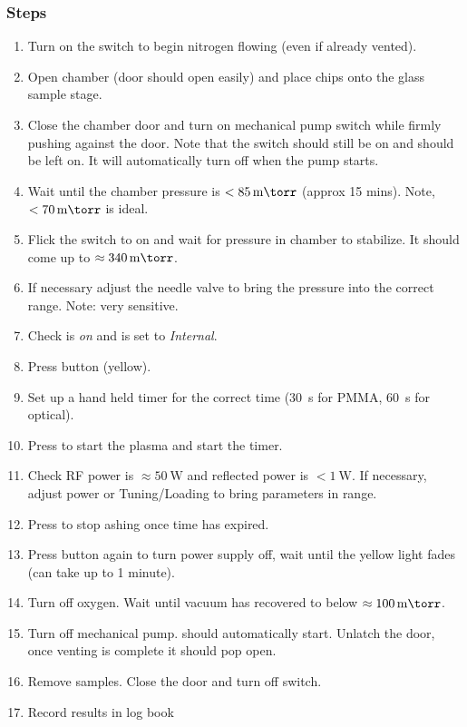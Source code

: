 \documentclass[12pt,a4paper]{report}
\begin{document}
\subsubsection{Steps}
\begin{enumerate}
  \item Turn on the  switch to begin nitrogen flowing (even if already vented).
  \item Open chamber (door should open easily) and place chips onto the glass sample stage.
  \item Close the chamber door and turn on mechanical pump switch while firmly pushing against the door. Note that
  the  switch should still be on and should be left on. It will automatically turn off when the pump starts.
  \item Wait until the chamber pressure is $< \SI{85}{\milli\torr}$ (approx 15 mins). Note, $< \SI{70}{\milli\torr}$ is ideal.
  \item Flick the  switch to on and wait for pressure in chamber to stabilize. It should come up to $\approx\SI{340}{\milli\torr}$.
  \item If necessary adjust the needle valve to bring the  pressure into the correct range. Note: very sensitive.
  \item Check  is {\em on} and  is set to {\em Internal}.
  \item Press  button (yellow).
  \item Set up a hand held timer for the correct time (\SI{30}{\second} for PMMA, \SI{60}{\second} for optical).
  \item Press  to start the plasma and start the timer.
  \item Check RF power is $\approx\SI{50}{\watt}$ and reflected power is $< \SI{1}{\watt}$. If necessary, adjust power or Tuning/Loading
    to bring parameters in range.
  \item Press  to stop ashing once time has expired.
  \item Press  button again to turn power supply off, wait until the yellow light fades (can take up to 1 minute).
  \item Turn off oxygen. Wait until vacuum has recovered to below $\approx\SI{100}{\milli\torr}$.
  \item Turn off mechanical pump.  should automatically start. Unlatch the door, once venting is complete it should pop open.
  \item Remove samples. Close the door and turn off  switch.
  \item Record results in log book
\end{enumerate}
\end{document}
